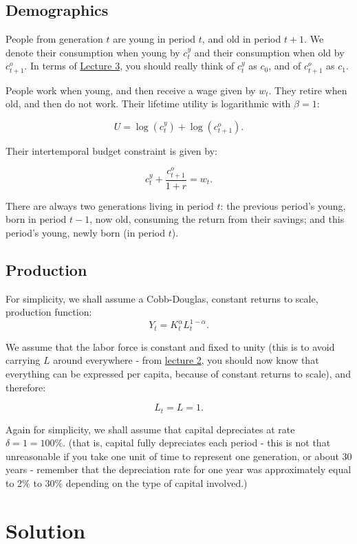 \documentclass[]{book}
\theoremstyle{definition}
\theoremstyle{definition}
\theoremstyle{definition}
\theoremstyle{remark}
\begin{document}
\subsection{Demographics}\label{demographics}

People from generation \(t\) are young in period \(t\), and old in
period \(t+1\). We denote their consumption when young by \(c_{t}^{y}\)
and their consumption when old by \(c_{t+1}^{o}\). In terms of
\href{lecture3.html}{Lecture 3}, you should really think of
\(c_{t}^{y}\) as \(c_{0}\), and of \(c_{t+1}^{o}\) as \(c_{1}\).

People work when young, and then receive a wage given by \(w_{t}\). They
retire when old, and then do not work. Their lifetime utility is
logarithmic with \(\beta=1\):

\[U=\log(c_{t}^{y})+\log(c_{t+1}^{o}).\]

Their intertemporal budget constraint is given by:

\[c_{t}^{y}+\frac{c_{t+1}^{o}}{1+r}=w_{t}.\]

There are always two generations living in period \(t\): the previous
period's young, born in period \(t-1\), now old, consuming the return
from their savings; and this period's young, newly born (in period
\(t\)).

\subsection{Production}\label{production}

For simplicity, we shall assume a Cobb-Douglas, constant returns to
scale, production function: \[Y_{t}=K_{t}^{\alpha}L_{t}^{1-\alpha}.\]

We assume that the labor force is constant and fixed to unity (this is
to avoid carrying \(L\) around everywhere - from
\href{lecture2.html}{lecture 2}, you should now know that everything can
be expressed per capita, because of constant returns to scale), and
therefore:

\[L_{t}=L=1.\]

Again for simplicity, we shall assume that capital depreciates at rate
\(\delta=1=100\%\). (that is, capital fully depreciates each period -
this is not that unreasonable if you take one unit of time to represent
one generation, or about 30 years - remember that the depreciation rate
for one year was approximately equal to 2\% to 30\% depending on the
type of capital involved.)

\section{Solution}\label{solution-1}
\end{document}
